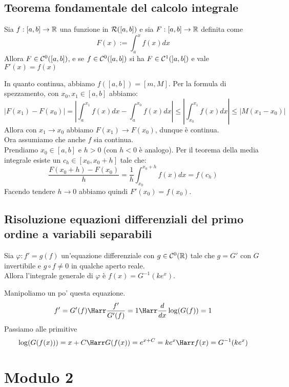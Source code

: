 \documentclass[openany]{book}
\begin{document}
\section{Teorema fondamentale del calcolo integrale}

\begin{theorem}{}{}
    Sia $f:[a,b] \to \mathbb{R}$ una funzione in $\mathcal{R}([a,b])$ e sia $F: [a,b]\to \mathbb{R}$ definita come
    \[F(x) := \int_a^x f(x) d x\]
    Allora $F \in \mathcal{C}^0([a,b])$, e se $f \in \mathcal{C}^0([a,b])$ si ha $F \in \mathcal{C}^1(]a,b[)$ e vale $F'(x)=f(x)$
\end{theorem}

    In quanto continua, abbiamo $f([a,b]) = [m,M]$. Per la formula di spezzamento, con $x_0, x_1 \in [a,b]$ abbiamo:
    \[|F(x_1) - F(x_0)| = \left|\int_a^{x_1} f(x)dx - \int_a^{x_0} f(x)dx\right| \le \left| \int_{x_0}^{x_1} f(x)dx\right| \le |M(x_1-x_0)|\]
    Allora con $x_1 \to x_0$ abbiamo $F(x_1)\to F(x_0)$, dunque è continua.\\
    Ora assumiamo che anche $f$ sia continua.\\
    Prendiamo $x_0 \in [a,b]$ e $h > 0$ (con $h<0$ è analogo). Per il teorema della media integrale esiste un $c_h \in [x_0, x_0 + h]$ tale che:
    \[\frac{F(x_0+h) - F(x_0)}{h} = \frac{1}{h} \int_{x_0}^{x_0+h}f(x)dx = f(c_h)\]
    Facendo tendere $h\to 0$ abbiamo quindi $F'(x_0) = f(x_0)$.


\section{Risoluzione equazioni differenziali del primo ordine a variabili separabili}

\begin{theorem}{}{}
    Sia $\varphi:f'= g(f)$ un'equazione differenziale con $g \in \mathcal{C}^0(\mathbb{R})$ tale che $g = G'$ con $G$ invertibile e $g\circ f \neq 0$ in qualche aperto reale.\\
    Allora l'integrale generale di $\varphi$ è $f(x) = G^{-1}(ke^x)$.
\end{theorem}

    Manipoliamo un po' questa equazione.
    \[f' = G'(f) \Harr \frac{f'}{G'(f)} = 1 \Harr \frac{d}{dx}\log (G(f)) = 1 \]
    Passiamo alle primitive 
    \[\log (G(f(x))) = x +C \Harr G(f(x)) = e^{x+C} = k e^x \Harr f(x) = G^{-1}(ke^x)\]


\chapter{Modulo 2}
\end{document}
